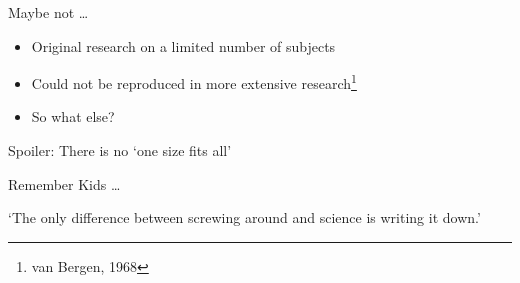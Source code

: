 \documentclass[aspectratio=169]{beamer}
\begin{document}
    {
    \begin{frame}{Maybe not \ldots}
        \begin{itemize}
            \item Original research on a limited number of subjects
            \item Could not be reproduced in more extensive research\footnote{van Bergen, 1968}
            \pause
            \item So what else?
        \end{itemize}
    \end{frame}
    }

    \begin{frame}[standout]
        Spoiler: There is no `one size fits all'
    \end{frame}

    {
    \begin{frame}{Remember Kids \ldots}
        \begin{titlebox}
            \centering
            `The only difference between screwing around and science is \alert{writing it down}.'
        \end{titlebox}
    \end{frame}
    }
\end{document}
